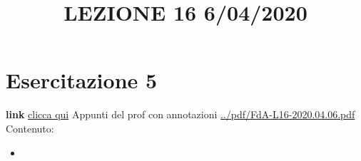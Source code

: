 \section{Esercitazione 5}
\title{LEZIONE 16 6/04/2020}\newline
\textbf{link} \href{https://web.microsoftstream.com/video/0384d9d2-5ddc-4381-8933-f46dc8fca4d3?list=user&userId=faa91214-a6f5-40d7-8875-253fd49b8ce1}{clicca qui}\newline
\newline
Appunti del prof con annotazioni \url{../pdf/FdA-L16-2020.04.06.pdf}\newline
Contenuto:
\begin{itemize}
    \item 
\end{itemize}